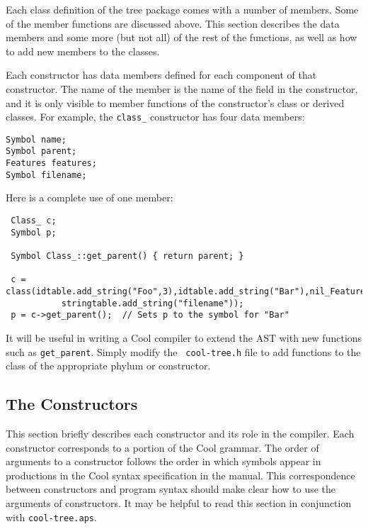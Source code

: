 Each class definition of the tree package comes with a number of
members.  Some of the member functions are discussed above.
This section describes the data members and some more (but not all) of
the rest of the functions, as well as how to add new members
to the classes.  

Each constructor has data members defined for
each component of that constructor. The name of the member is the name of
the field in the constructor, and it is only visible to member functions
of the constructor's class or derived classes.
 For example, the {\tt class\_} constructor
has four data members:
\begin{verbatim}
Symbol name;
Symbol parent;
Features features;
Symbol filename;
\end{verbatim}
Here is a complete use of one member:
\begin{verbatim}
 Class_ c;
 Symbol p;

 Symbol Class_::get_parent() { return parent; }

 c = class(idtable.add_string("Foo",3),idtable.add_string("Bar"),nil_Features(),
           stringtable.add_string("filename"));
 p = c->get_parent();  // Sets p to the symbol for "Bar"
\end{verbatim}

It will be useful in writing a Cool compiler to extend the AST with
new functions such as {\tt get\_parent}. Simply modify the {\tt
cool-tree.h} file to add functions to the class of the appropriate
phylum or constructor.



\subsection{The Constructors}
\label{sec-con}

This section briefly describes each
constructor and its role in the compiler.
Each constructor corresponds to a portion of the Cool grammar.  The
order of arguments to a constructor follows the order in which symbols
appear in productions in the Cool syntax specification in the manual.
This correspondence between constructors and program syntax should
make clear how to use the arguments of constructors.  It
may be helpful to read this section in conjunction with {\tt cool-tree.aps}.

